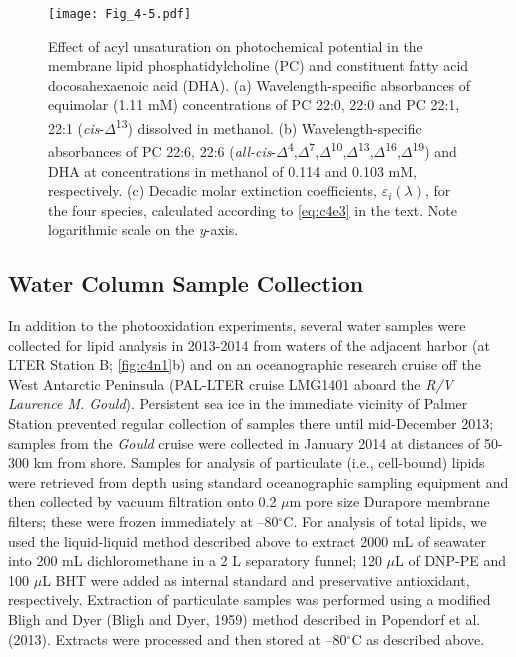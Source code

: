 \begin{figure}
\centering
\texttt{[image: Fig\_4-5.pdf]}
\caption[Wavelength-specific absorbances and decadic molar extinction coefficients of phosphatidylcholine and DHA]{Effect of acyl unsaturation on photochemical potential in the membrane lipid phosphatidylcholine (PC) and constituent fatty acid docosahexaenoic acid (DHA). (a) Wavelength-specific absorbances of equimolar (1.11 mM) concentrations of PC 22:0, 22:0 and PC 22:1, 22:1 (\emph{cis}-$\Delta$\textsuperscript{13}) dissolved in methanol. (b) Wavelength-specific absorbances of PC 22:6, 22:6 (\emph{all-cis}-$\Delta$\textsuperscript{4},$\Delta$\textsuperscript{7},$\Delta$\textsuperscript{10},$\Delta$\textsuperscript{13},$\Delta$\textsuperscript{16},$\Delta$\textsuperscript{19}) and DHA at concentrations in methanol of 0.114 and 0.103 mM, respectively. (c) Decadic molar extinction coefficients, ${\varepsilon _i}(\lambda )$, for the four species, calculated according to \autoref{eq:c4e3} in the text. Note logarithmic scale on the \emph{y}-axis.}
\label{fig:c4n5}
\end{figure}

\subsection{Water Column Sample Collection}

In addition to the photooxidation experiments, several water samples were collected for lipid analysis in 2013-2014 from waters of the adjacent harbor (at LTER Station B; \autoref{fig:c4n1}b) and on an oceanographic research cruise off the West Antarctic Peninsula (PAL-LTER cruise LMG1401 aboard the \emph{R/V Laurence M. Gould}). Persistent sea ice in the immediate vicinity of Palmer Station prevented regular collection of samples there until mid-December 2013; samples from the \emph{Gould} cruise were collected in January 2014 at distances of 50-300 km from shore. Samples for analysis of particulate (i.e., cell-bound) lipids were retrieved from depth using standard oceanographic sampling equipment and then collected by vacuum filtration onto 0.2 $\mu$m pore size Durapore membrane filters; these were frozen immediately at --80$^{\circ}$C. For analysis of total lipids, we used the liquid-liquid method described above to extract 2000 mL of seawater into 200 mL dichloromethane in a 2 L separatory funnel; 120 $\mu$L of DNP-PE and 100 $\mu$L BHT were added as internal standard and preservative antioxidant, respectively. Extraction of particulate samples was performed using a modified Bligh and Dyer (Bligh and Dyer, 1959) method described in Popendorf et al. (2013). Extracts were processed and then stored at --80$^{\circ}$C as described above.

